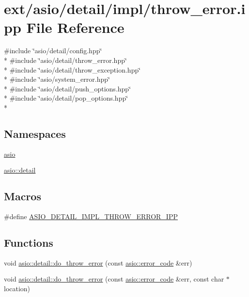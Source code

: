\hypertarget{throw__error_8ipp}{}\section{ext/asio/detail/impl/throw\+\_\+error.ipp File Reference}
\label{throw__error_8ipp}
{\ttfamily \#include \char`\"{}asio/detail/config.\+hpp\char`\"{}}\\*
{\ttfamily \#include \char`\"{}asio/detail/throw\+\_\+error.\+hpp\char`\"{}}\\*
{\ttfamily \#include \char`\"{}asio/detail/throw\+\_\+exception.\+hpp\char`\"{}}\\*
{\ttfamily \#include \char`\"{}asio/system\+\_\+error.\+hpp\char`\"{}}\\*
{\ttfamily \#include \char`\"{}asio/detail/push\+\_\+options.\+hpp\char`\"{}}\\*
{\ttfamily \#include \char`\"{}asio/detail/pop\+\_\+options.\+hpp\char`\"{}}\\*
\subsection*{Namespaces}
\begin{DoxyCompactItemize}
\item 
 \hyperlink{namespaceasio}{asio}
\item 
 \hyperlink{namespaceasio_1_1detail}{asio\+::detail}
\end{DoxyCompactItemize}
\subsection*{Macros}
\begin{DoxyCompactItemize}
\item 
\#define \hyperlink{throw__error_8ipp_a24cc00f8bed30768eb5a4b2d5726f4ee}{A\+S\+I\+O\+\_\+\+D\+E\+T\+A\+I\+L\+\_\+\+I\+M\+P\+L\+\_\+\+T\+H\+R\+O\+W\+\_\+\+E\+R\+R\+O\+R\+\_\+\+I\+P\+P}
\end{DoxyCompactItemize}
\subsection*{Functions}
\begin{DoxyCompactItemize}
\item 
void \hyperlink{namespaceasio_1_1detail_ab9418bf2d1d8373eb96b01633bab1af3}{asio\+::detail\+::do\+\_\+throw\+\_\+error} (const \hyperlink{classasio_1_1error__code}{asio\+::error\+\_\+code} \&err)
\item 
void \hyperlink{namespaceasio_1_1detail_aeee91fb7f86bb34dce4e56b59f52241a}{asio\+::detail\+::do\+\_\+throw\+\_\+error} (const \hyperlink{classasio_1_1error__code}{asio\+::error\+\_\+code} \&err, const char $\ast$location)
\end{DoxyCompactItemize}


